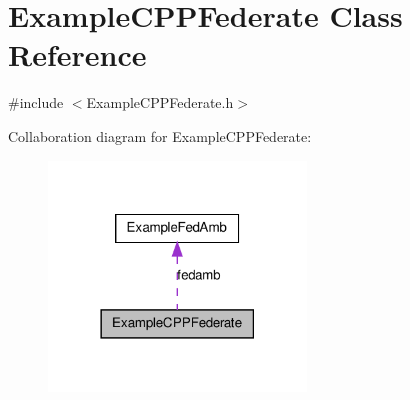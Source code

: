 \hypertarget{class_example_c_p_p_federate}{
\section{ExampleCPPFederate Class Reference}
\label{class_example_c_p_p_federate}
}


{\ttfamily \#include $<$ExampleCPPFederate.h$>$}



Collaboration diagram for ExampleCPPFederate:\nopagebreak
\begin{figure}[H]
\begin{center}
\leavevmode
\includegraphics[width=194pt]{class_example_c_p_p_federate__coll__graph}
\end{center}
\end{figure}
